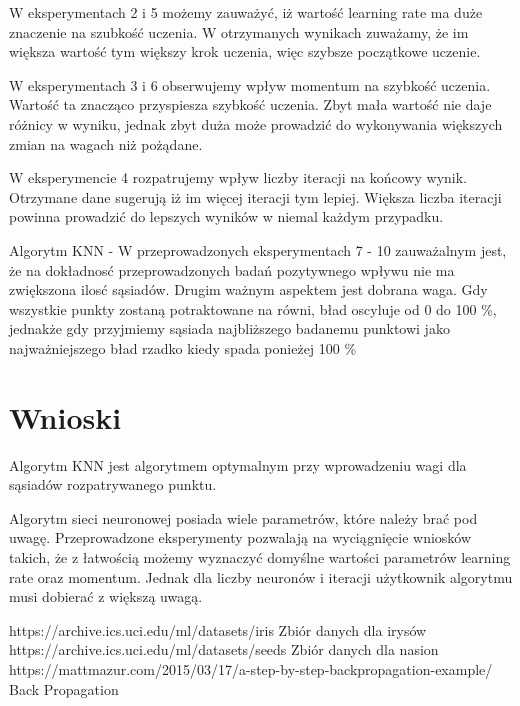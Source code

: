 \documentclass{classrep}
\begin{document}
W eksperymentach 2 i 5 możemy zauważyć, iż wartość learning rate ma duże znaczenie na szubkość uczenia. W otrzymanych wynikach zuważamy, że im większa wartość tym większy krok uczenia, więc szybsze początkowe uczenie.


W eksperymentach 3 i 6 obserwujemy wpływ momentum na szybkość uczenia. Wartość ta znacząco przyspiesza szybkość uczenia. Zbyt mała wartość nie daje różnicy w wyniku, jednak zbyt duża może prowadzić do wykonywania większych zmian na wagach niż pożądane.


W eksperymencie 4 rozpatrujemy wpływ liczby iteracji na końcowy wynik. Otrzymane dane sugerują iż im więcej iteracji tym lepiej. Większa liczba iteracji powinna prowadzić do lepszych wyników w niemal każdym przypadku.


Algorytm KNN - W przeprowadzonych eksperymentach 7 - 10 zauważalnym jest, że na dokładnosć przeprowadzonych badań pozytywnego wpływu nie ma zwiększona ilosć sąsiadów. Drugim ważnym aspektem jest dobrana waga. Gdy wszystkie punkty zostaną potraktowane na równi, bład oscyluje od 0 do 100 \%, jednakże gdy przyjmiemy sąsiada najbliższego badanemu punktowi jako najważniejszego bład rzadko kiedy spada ponieżej 100 \%
\section{Wnioski}
Algorytm KNN jest algorytmem optymalnym przy wprowadzeniu wagi dla sąsiadów rozpatrywanego punktu.


Algorytm sieci neuronowej posiada wiele parametrów, które należy brać pod uwagę. Przeprowadzone eksperymenty pozwalają na wyciągnięcie wniosków takich, że z łatwością możemy wyznaczyć domyślne wartości parametrów learning rate oraz momentum. Jednak dla liczby neuronów i iteracji użytkownik algorytmu musi dobierać z większą uwagą.

\begin{thebibliography}{0}
https://archive.ics.uci.edu/ml/datasets/iris
Zbiór danych dla irysów
https://archive.ics.uci.edu/ml/datasets/seeds
Zbiór danych dla nasion
https://mattmazur.com/2015/03/17/a-step-by-step-backpropagation-example/
Back Propagation
\end{thebibliography}
\end{document}
